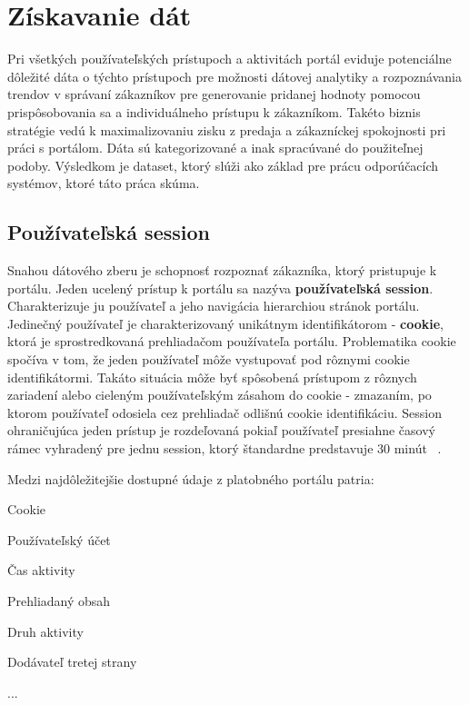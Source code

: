\section{Získavanie dát}
\label{analyza_ziskavanie_dat}

Pri všetkých používateľských prístupoch a aktivitách portál eviduje potenciálne dôležité dáta o týchto prístupoch pre možnosti dátovej analytiky a rozpoznávania trendov v správaní zákazníkov pre generovanie pridanej hodnoty pomocou prispôsobovania sa a individuálneho prístupu k zákazníkom. Takéto biznis stratégie vedú k maximalizovaniu zisku z predaja a zákazníckej spokojnosti pri práci s portálom. Dáta sú kategorizované a inak spracúvané do použiteľnej podoby. Výsledkom je dataset, ktorý slúži ako základ pre prácu odporúčacích systémov, ktoré táto práca skúma.

\subsection{Používateľská session}
\label{session}
Snahou dátového zberu je schopnosť rozpoznať zákazníka, ktorý pristupuje k portálu. Jeden ucelený prístup k portálu sa nazýva \textbf{používateľská session}. Charakterizuje ju používateľ a jeho navigácia hierarchiou stránok portálu. Jedinečný používateľ je charakterizovaný unikátnym identifikátorom - \textbf{cookie}, ktorá je sprostredkovaná prehliadačom používateľa portálu. Problematika cookie spočíva v tom, že jeden používateľ môže vystupovať pod rôznymi cookie identifikátormi. Takáto situácia môže byť spôsobená prístupom z rôznych zariadení alebo cieleným používateľským zásahom do cookie - zmazaním, po ktorom používateľ odosiela cez prehliadač odlišnú cookie identifikáciu. Session ohraničujúca jeden prístup je rozdeľovaná pokiaľ používateľ presiahne časový rámec vyhradený pre jednu session, ktorý štandardne predstavuje 30 minút ~\cite{zhou2010research}.

Medzi najdôležitejšie dostupné údaje z platobného portálu patria:

\begin{my_itemize}
	\item {Cookie}
	\item {Používateľský účet}
	\item {Čas aktivity}
	\item {Prehliadaný obsah}
	\item {Druh aktivity}
	\item {Dodávateľ tretej strany}
	\item {...}
\end{my_itemize}

